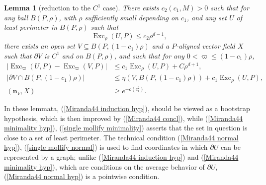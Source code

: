 \documentclass[reqno,11pt]{amsart}
\DeclareMathOperator{\Exc}{Exc}
\newcommand{\normal}{\mathbf n}
\newtheorem{lemma}[theorem]{Lemma}
\theoremstyle{definition}
\numberwithin{equation}{section}
\begin{document}
\begin{lemma}[reduction to the $C^1$ case]\label{single mollify}
There exists $c_2(c_1, M) > 0$ such that for any ball $B(P, \rho)$, with $\rho$ sufficiently small depending on $c_1$, and any set $U$ of least perimeter in $B(P, \rho)$ such that
\begin{equation}\label{single mollify hyp}
\Exc_\rho (U, P) \leq c_2 \rho^{d - 1},
\end{equation}
there exists an open set $V \subseteq B(P, (1 - c_1)\rho)$ and a $P$-aligned vector field $X$ such that $\partial V$ is $C^1$ and on $B(P, \rho)$, and such that for any $0 < \varpi \leq (1 - c_1)\rho$,
\begin{align}
|\Exc_\varpi (U, P) - \Exc_\varpi (V, P)| &\leq c_1 \Exc_\rho (U, P) + C\rho^{d + 1}, \label{single mollify excess} \\
|\partial V \cap B(P, (1 - c_1)\rho)| &\leq \eta(V, B(P, (1 - c_1)\rho)) + c_1 \Exc_\rho (U, P), \label{single mollify minimality} \\
(\normal_V, X) &\geq e^{-o(c_1^2)}. \label{single mollify normal}
\end{align}
\end{lemma}

In these lemmata, (\ref{Miranda44 induction hyp}), should be viewed as a bootstrap hypothesis, which is then improved by (\ref{Miranda44 concl}), while (\ref{Miranda44 minimality hyp}), (\ref{single mollify minimality}) asserts that the set in question is close to a set of least perimeter.
The technical condition (\ref{Miranda44 normal hyp}), (\ref{single mollify normal}) is used to find coordinates in which $\partial U$ can be represented by a graph; unlike (\ref{Miranda44 induction hyp}) and (\ref{Miranda44 minimality hyp}), which are conditions on the average behavior of $\partial U$, (\ref{Miranda44 normal hyp}) is a pointwise condition.
\end{document}

